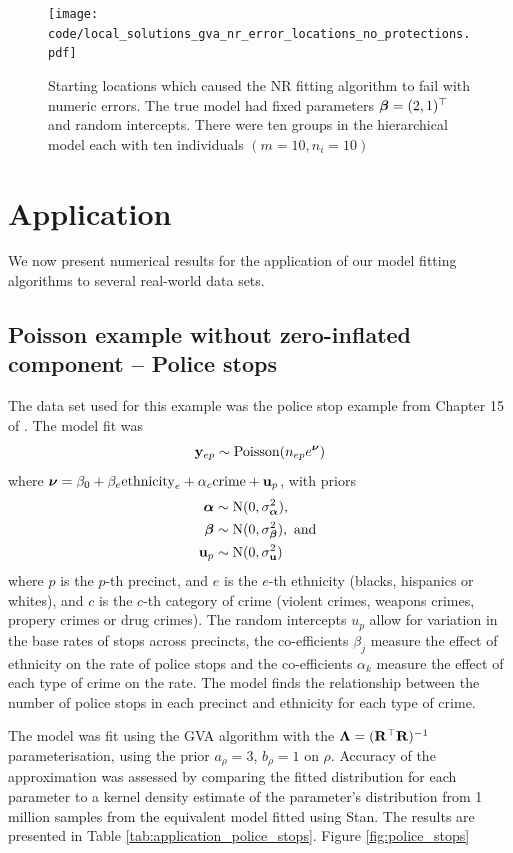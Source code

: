 \begin{figure}[h!]
	\texttt{[image: code/local\_solutions\_gva\_nr\_error\_locations\_no\_protections.pdf]}
	\label{fig:stability_locations_nr}
	\caption{Starting locations which caused the NR fitting algorithm to fail with numeric errors. The true model had fixed parameters ${\boldsymbol \beta} = (2, 1)^\top$ and random intercepts. There were ten groups in the
	hierarchical model each	with ten individuals $(m=10, n_i=10)$}
\end{figure}

\section{Application}
We now present numerical results for the application of our model fitting algorithms to several real-world
data sets.

\label{sec:application}

\subsection{Poisson example without zero-inflated component -- Police stops}
\label{sec:police_stops}
The data set used for this example was the police stop example from Chapter 15 of \cite{Gelman2007}.
The model fit was
$$
	{\bf y}_{ep}        \sim \text{Poisson}(n_{ep} e^{\boldsymbol \nu})
$$
where ${\boldsymbol \nu} = {\beta_0 + \beta_e \text{ethnicity}_e + \alpha_{c} \text{crime} + {\bf u}_p}$, with priors
\begin{align*}
	{\boldsymbol\alpha}				& \sim \text{N}(0, \sigma_{\boldsymbol \alpha}^2),	\\
	{\boldsymbol \beta}        & \sim \text{N}(0, \sigma_{\boldsymbol \beta}^2), \text{ and }\\
	{\bf u}_p         & \sim \text{N}(0, \sigma_{\bf u}^2)
\end{align*}
where $p$ is the $p$-th precinct, and $e$ is the $e$-th ethnicity (blacks, hispanics or whites), and $c$ is
the $c$-th category of crime (violent crimes, weapons crimes, propery crimes or drug crimes). The random
intercepts $u_p$ allow for variation in the base rates of stops across precincts, the co-efficients $\beta_j$
measure the effect of ethnicity on the rate of police stops and the co-efficients $\alpha_k$ measure the
effect of each type of crime on the rate. The model finds the relationship between the number of police stops
in each precinct and  ethnicity for each type of crime.

The model was fit using the GVA algorithm with the ${\boldsymbol \Lambda} = ({\bf R}^\top {\bf R})^{-1}$ parameterisation, using
the prior $a_\rho = 3$, $b_\rho = 1$ on $\rho$. Accuracy of the approximation was assessed by comparing the
fitted distribution for each parameter to a kernel density estimate of the parameter's distribution from 1
million samples from the equivalent model fitted using Stan. The results are presented in Table
\ref{tab:application_police_stops}. Figure \ref{fig:police_stops}

